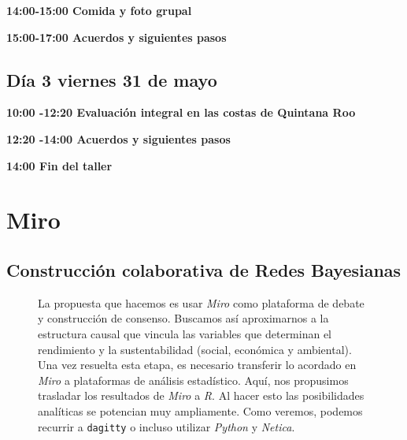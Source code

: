 \documentclass[
  letterpaper,
  DIV=11,
  numbers=noendperiod]{scrreprt}
\begin{document}
\textbf{14:00-15:00 Comida y foto grupal}

\textbf{15:00-17:00 Acuerdos y siguientes pasos}

\hypertarget{duxeda-3-viernes-31-de-mayo}{%
\subsection{Día 3 viernes 31 de
mayo}\label{duxeda-3-viernes-31-de-mayo}}

\textbf{10:00 -12:20 Evaluación integral en las costas de Quintana Roo}

\textbf{12:20 -14:00 Acuerdos y siguientes pasos}

\textbf{14:00 Fin del taller}

\hypertarget{miro}{%
\section{Miro}\label{miro}}

\hypertarget{construcciuxf3n-colaborativa-de-redes-bayesianas}{%
\subsection{Construcción colaborativa de Redes
Bayesianas}\label{construcciuxf3n-colaborativa-de-redes-bayesianas}}

\begin{figure}

\begin{minipage}[t]{0.50\linewidth}

{\centering 

La propuesta que hacemos es usar \emph{Miro} como plataforma de debate y
construcción de consenso. Buscamos así aproximarnos a la estructura
causal que vincula las variables que determinan el rendimiento y la
sustentabilidad (social, económica y ambiental). Una vez resuelta esta
etapa, es necesario transferir lo acordado en \emph{Miro} a plataformas
de análisis estadístico. Aquí, nos propusimos trasladar los resultados
de \emph{Miro} a \emph{R}. Al hacer esto las posibilidades analíticas se
potencian muy ampliamente. Como veremos, podemos recurrir a
\texttt{dagitty} o incluso utilizar \emph{Python} y \emph{Netica}.

}

\end{minipage}%
%
\begin{minipage}[t]{0.50\linewidth}

{\centering 


}

\end{minipage}%

\end{figure}
\end{document}
